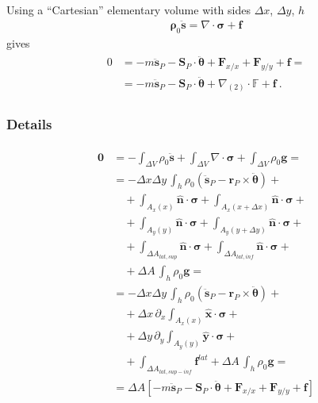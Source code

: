 \documentclass[letterpaper,10pt,english]{jupyterBook}
\begin{document}
\sphinxAtStartPar
{} Using a “Cartesian” elementary volume with sides \(\Delta x\), \(\Delta y\), \(h\)
\begin{equation*}
\begin{split}\mathbf{\rho}_0 \ddot{\mathbf{s}} = \nabla \cdot \boldsymbol\sigma + \mathbf{f}\end{split}
\end{equation*}
\sphinxAtStartPar
gives
\begin{equation*}
\begin{split}\begin{aligned}
 0 
 & = - m \ddot{\mathbf{s}}_P - \mathbf{S}_{P} \cdot \ddot{\boldsymbol\theta} + \mathbf{F}_{x/x} + \mathbf{F}_{y/y} + \mathbf{f} = \\
 & = - m \ddot{\mathbf{s}}_P - \mathbf{S}_{P} \cdot \ddot{\boldsymbol\theta} + \nabla_{(2)} \cdot \mathbb{F} + \mathbf{f} \ .
\end{aligned}\end{split}
\end{equation*}\subsubsection*{Details}
\begin{equation*}
\begin{split}\begin{aligned}
  \mathbf{0} 
& = - \int_{\Delta V} \rho_0 \ddot{\mathbf{s}} + \int_{\Delta V} \nabla \cdot \boldsymbol\sigma + \int_{\Delta V} \rho_0 \mathbf{g} = \\
& = - \Delta x \Delta y \, \int_{h} \rho_0 \left( \ddot{\mathbf{s}}_P - \mathbf{r}_P \times \ddot{\boldsymbol{\theta}} \right) + \\
  & \quad + \int_{A_x(x)} \hat{\mathbf{n}} \cdot \boldsymbol\sigma + \int_{A_x(x+\Delta x)} \hat{\mathbf{n}} \cdot \boldsymbol\sigma  + \\
  & \quad + \int_{A_y(y)} \hat{\mathbf{n}} \cdot \boldsymbol\sigma + \int_{A_y(y+\Delta y)} \hat{\mathbf{n}} \cdot \boldsymbol\sigma  + \\
  & \quad + \int_{\Delta A_{lat,sup}} \hat{\mathbf{n}} \cdot \boldsymbol\sigma + \int_{\Delta A_{lat,inf}} \hat{\mathbf{n}} \cdot \boldsymbol\sigma +  \\
  & \quad + \Delta A \, \int_{h} \rho_0 \mathbf{g} = \\
& = - \Delta x \Delta y \, \int_{h} \rho_0 \left( \ddot{\mathbf{s}}_P - \mathbf{r}_P \times \ddot{\boldsymbol{\theta}} \right) + \\
  & \quad + \Delta x \, \partial_x \int_{A_x(x)} \hat{\mathbf{x}} \cdot \boldsymbol\sigma  + \\
  & \quad + \Delta y \, \partial_y \int_{A_y(y)} \hat{\mathbf{y}} \cdot \boldsymbol\sigma  + \\
  & \quad + \int_{\Delta A_{lat,sup-inf}} \mathbf{f}^{lat} 
          + \Delta A \, \int_{h} \rho_0 \mathbf{g} = \\
& = \Delta A \left[ - m \ddot{\mathbf{s}}_P - \mathbf{S}_{P} \cdot \ddot{\boldsymbol\theta} + \mathbf{F}_{x/x} + \mathbf{F}_{y/y} + \mathbf{f} \right]
\end{aligned}\end{split}
\end{equation*}
\end{document}

